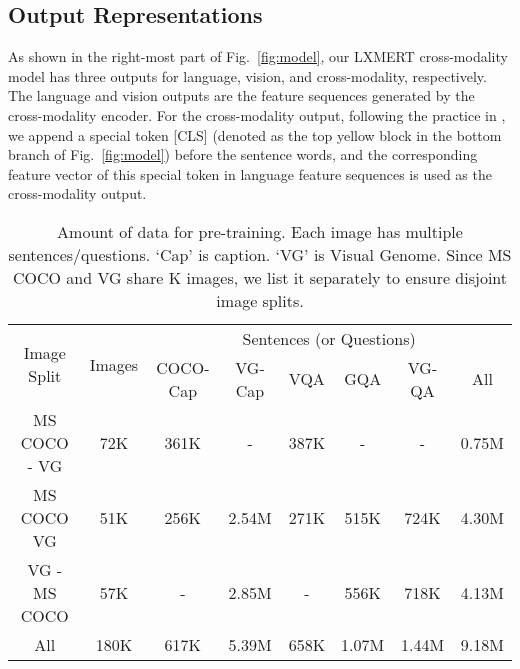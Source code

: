 \documentclass[11pt,a4paper]{article}
\begin{document}
\subsection{Output Representations}
As shown in the right-most part of Fig.~\ref{fig:model}, our LXMERT cross-modality model has three outputs for language, vision, and cross-modality, respectively.
The language and vision outputs are the feature sequences generated by the cross-modality encoder. 
For the cross-modality output, following the practice in , we append a special token [CLS] (denoted as the top yellow block in the bottom branch of Fig.~\ref{fig:model}) before the sentence words, and the corresponding feature vector of this special token in language feature sequences is used as the cross-modality output. \begin{table*}[]
\centering
\begin{tabular}{cccccccc}
\toprule
\multirow{2}{*}{Image Split} & 
\multirow{2}{*}{Images}
& \multicolumn{6}{c}{Sentences (or Questions) }         \\ \cmidrule(lr){3-8}
                                                                                   &                                                                             & COCO-Cap & VG-Cap & VQA  & GQA   & VG-QA & All   \\ \midrule
MS COCO - VG                                                                       & 72K                                                                         & 361K     & -      & 387K & -     & -     & 0.75M  \\
MS COCO  VG                                                                  & 51K                                                                         & 256K     & 2.54M  & 271K & 515K  & 724K  & 4.30M \\
VG - MS COCO                                                                       & 57K                                                                         & -        & 2.85M  & -    & 556K  & 718K  & 4.13M \\ \midrule
All                                                                                & 180K                                                                        & 617K     & 5.39M  & 658K & 1.07M & 1.44M & 9.18M \\
\bottomrule
\end{tabular}
\caption{Amount of data for pre-training. Each image has multiple sentences/questions. `Cap' is caption. `VG' is Visual Genome. Since MS COCO and VG share K images, we list it separately to ensure disjoint image splits. }
\vspace{-8pt}
\label{table:pretrain}
\end{table*}
\end{document}
